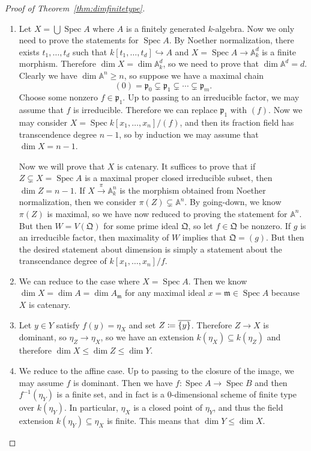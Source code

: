 \documentclass[leqno, openany]{memoir}
\theoremstyle{definition}
\theoremstyle{remark}
\theoremstyle{plain}
\theoremstyle{definition}
\theoremstyle{remark}
\newcommand{\A}{\mathbb{A}}
\newcommand{\mf}[1]{\mathfrak{#1}}
\newcommand{\ol}[1]{\overline{#1}}
\DeclareMathOperator{\Spec}{Spec}
\begin{document}
\begin{proof}[Proof of Theorem~\ref{thm:dimfinitetype}]\leavevmode
    \begin{enumerate}
        \item Let $X = \bigcup \Spec A$ where $A$ is a finitely generated $k$-algebra. Now we only need to prove the statements for $\Spec A$. By Noether normalization, there exists $t_1, \ldots, t_d$ such that $k[t_1, \ldots, t_d] \hookrightarrow A$ and $X = \Spec A \to \A_k^d$ is a finite morphism. Therefore $\dim X = \dim \A^d_k$, so we need to prove that $\dim \A^d = d$. Clearly we have $\dim \A^n \geq n$, so suppose we have a maximal chain
            \[ (0) = \mf{p}_0 \subsetneq \mf{p}_1 \subsetneq \cdots \subsetneq \mf{p}_m. \]
            Choose some nonzero $f \in \mf{p}_1$. Up to passing to an irreducible factor, we may assume that $f$ is irreducible. Therefore we can replace $\mf{p}_1$ with $(f)$. Now we may consider $X = \Spec k[x_1, \ldots, x_n]/(f)$, and then its fraction field has transcendence degree $n-1$, so by induction we may assume that $\dim X = n-1$.

            Now we will prove that $X$ is catenary. It suffices to prove that if $Z \subsetneq X = \Spec A$ is a maximal proper closed irreducible subset, then $\dim Z = n-1$. If $X \xrightarrow{\pi} \A^n_k$ is the morphism obtained from Noether normalization, then we consider $\pi(Z) \subsetneq \A^n$. By going-down, we know $\pi(Z)$ is maximal, so we have now reduced to proving the statement for $\A^n$. But then $W = V(\mf{Q})$ for some prime ideal $\mf{Q}$, so let $f \in \mf{Q}$ be nonzero. If $g$ is an irreducible factor, then maximality of $W$ implies that $\mf{Q} = (g)$. But then the desired statement about dimension is simply a statement about the transcendance degree of $k[x_1, \ldots, x_n]/f$.
        \item We can reduce to the case where $X = \Spec A$. Then we know $\dim X = \dim A = \dim A_{\mf{m}}$ for any maximal ideal $x = \mf{m} \in \Spec A$ because $X$ is catenary.
        \item Let $y \in Y$ satisfy $f(y) = \eta_X$ and set $Z \coloneqq \ol{\qty{y}}$. Therefore $Z \to X$ is dominant, so $\eta_Z \to \eta_X$, so we have an extension $k(\eta_X) \subseteq k(\eta_Z)$ and therefore $\dim X \leq \dim Z \leq \dim Y$.
        \item We reduce to the affine case. Up to passing to the closure of the image, we may assume $f$ is dominant. Then we have $f \colon \Spec A \to \Spec B$ and then $f^{-1}(\eta_Y)$ is a finite set, and in fact is a $0$-dimensional scheme of finite type over $k(\eta_Y)$. In particular, $\eta_X$ is a closed point of $\eta_Y$, and thus the field extension $k(\eta_Y) \subseteq \eta_X$ is finite. This means that $\dim Y \leq \dim X$. \qedhere
    \end{enumerate}
\end{proof}
\end{document}
